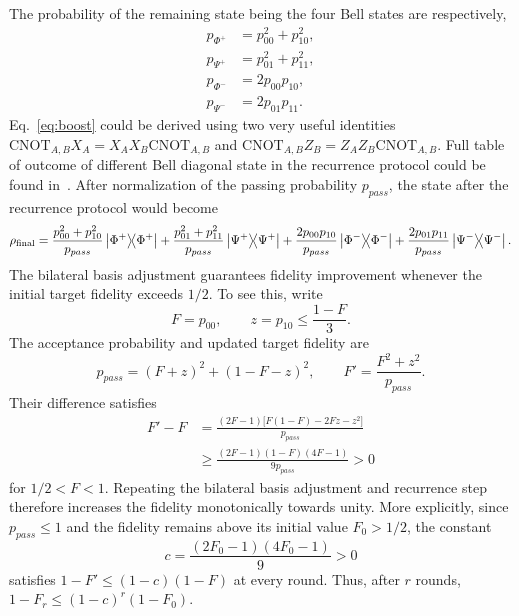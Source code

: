 \documentclass[onecolumn,prx,longbibliography,nofootinbib, superscriptaddress]{revtex4-2}
\theoremstyle{recap}
\begin{document}
The probability of the remaining state being the four Bell states are respectively,
\begin{equation}\label{eq:boost}
\begin{split}
    p_{\Phi^+}&=p_{00}^2+p_{10}^2,\\
    p_{\Psi^+}&=p_{01}^2+p_{11}^2,\\
    p_{\Phi^-}&=2p_{00}p_{10},\\
    p_{\Psi^-}&=2p_{01}p_{11}.
\end{split}
\end{equation}
Eq.~\eqref{eq:boost} could be derived using two very useful identities $\mathrm{CNOT}_{A,B}X_A=X_AX_B\mathrm{CNOT}_{A,B}$ and $\mathrm{CNOT}_{A,B}Z_B=Z_AZ_B\mathrm{CNOT}_{A,B}$. Full table of outcome of different Bell diagonal state in the recurrence protocol could be found in~\cite{BDSW}. After normalization of the passing probability $p_{pass}$, the state after the recurrence protocol would become
\begin{equation}
    \rho_{\mathrm{final}}=\frac{p_{00}^2+p_{10}^2}{p_{pass}}\ketbra{\Phi^+}{\Phi^+}+\frac{p_{01}^2+p_{11}^2}{p_{pass}}\ketbra{\Psi^+}{\Psi^+}+\frac{2p_{00}p_{10}}{p_{pass}}\ketbra{\Phi^-}{\Phi^-}+\frac{2p_{01}p_{11}}{p_{pass}}\ketbra{\Psi^-}{\Psi^-}.
\end{equation}
The bilateral basis adjustment guarantees fidelity improvement whenever the initial target fidelity exceeds $1/2$. To see this, write
\[
    F=p_{00},\qquad z=p_{10}\leq\frac{1-F}{3}.
\]
The acceptance probability and updated target fidelity are
\[
    p_{pass}=(F+z)^2+(1-F-z)^2,\qquad F'=\frac{F^2+z^2}{p_{pass}}.
\]
Their difference satisfies
\[
\begin{split}
    F'-F&=\frac{(2F-1)\bigl[F(1-F)-2Fz-z^2\bigr]}{p_{pass}}\\
    &\geq\frac{(2F-1)(1-F)(4F-1)}{9p_{pass}}>0
\end{split}
\]
for $1/2<F<1$. Repeating the bilateral basis adjustment and recurrence step therefore increases the fidelity monotonically towards unity. More explicitly, since $p_{pass}\leq1$ and the fidelity remains above its initial value $F_0>1/2$, the constant
\[
    c=\frac{(2F_0-1)(4F_0-1)}{9}>0
\]
satisfies $1-F'\leq(1-c)(1-F)$ at every round. Thus, after $r$ rounds, $1-F_r\leq(1-c)^r(1-F_0)$.
\end{document}
